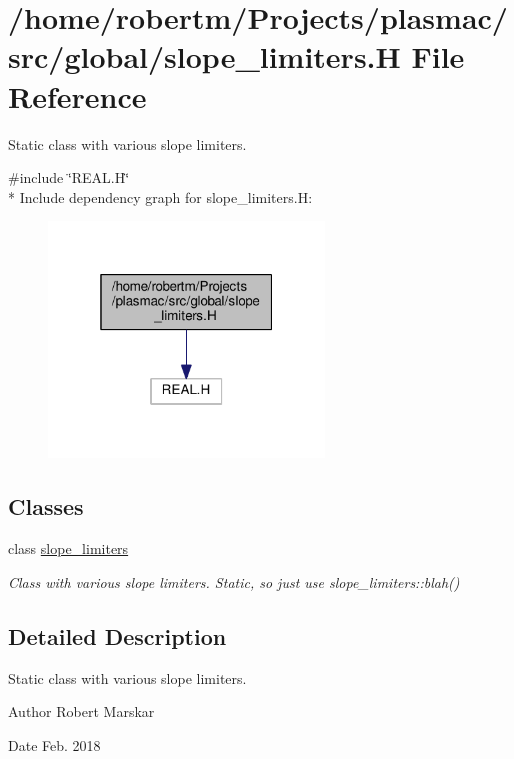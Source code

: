 \hypertarget{slope__limiters_8H}{}\section{/home/robertm/\+Projects/plasmac/src/global/slope\+\_\+limiters.H File Reference}
\label{slope__limiters_8H}


Static class with various slope limiters.  


{\ttfamily \#include \char`\"{}R\+E\+A\+L.\+H\char`\"{}}\\*
Include dependency graph for slope\+\_\+limiters.\+H\+:\nopagebreak
\begin{figure}[H]
\begin{center}
\leavevmode
\includegraphics[width=208pt]{slope__limiters_8H__incl}
\end{center}
\end{figure}
\subsection*{Classes}
\begin{DoxyCompactItemize}
\item 
class \hyperlink{classslope__limiters}{slope\+\_\+limiters}
\begin{DoxyCompactList}\small\item\em Class with various slope limiters. Static, so just use slope\+\_\+limiters\+::blah() \end{DoxyCompactList}\end{DoxyCompactItemize}


\subsection{Detailed Description}
Static class with various slope limiters. 

\begin{DoxyAuthor}{Author}
Robert Marskar 
\end{DoxyAuthor}
\begin{DoxyDate}{Date}
Feb. 2018 
\end{DoxyDate}

